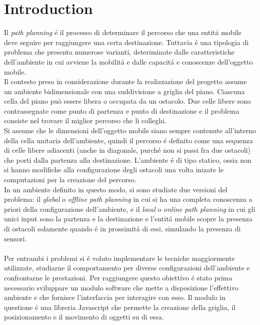 \documentclass[conference]{IEEEtran}
\begin{document}
\section{Introduction}
Il \textit{path planning} \'e il processo di determinare il percorso che una 
entit\'a mobile deve seguire per raggiungere una certa destinazione. Tuttavia \'e una tipologia 
di problema che presenta numerose varianti, deteriminate dalle caratteristiche dell'ambiente
in cui avviene la mobilit\'a e dalle capacit\'a e conoscenze dell'oggetto mobile. 
\\
Il contesto preso in considerazione durante la realizzazione del progetto assume un ambiente
bidimensionale con una suddivisione a griglia del piano. Ciascuna cella del piano può essere libera
o occupata da un ostacolo. Due celle libere sono contrassegnate come punto di partenza e punto di
destinazione e il problema consiste nel trovare il miglior percorso che li colleghi.
\\
Si assume che le dimensioni dell'oggetto mobile siano sempre contenute all'interno della cella
unitaria dell'ambiente, quindi il percorso \'e definito come una sequenza di celle libere 
adiacenti (anche in diagonale, purch\'e non si passi fra due ostacoli) che porti dalla partenza 
alla destinazione. 
L'ambiente \'e di tipo statico, ossia non si hanno modifiche alla configurazione degli ostacoli
una volta inizate le computazioni per la creazione del percorso.
\\
In un ambiente definito in questo modo, si sono studiate due versioni del problema: il 
\textit{global} o \textit{offline path planning} in cui si ha una completa conoscenza a priori
della configurazione dell'ambiente, e il \textit{local} o \textit{online path planning} in cui gli
unici input sono la partenza e la destinazione e l'entit\'a mobile scopre la presenza di ostacoli
solamente quando \'e in prossimit\'a di essi, simulando la presenza di sensori.
\\
\\ 
Per entrambi i problemi si \'e voluto implementare le tecniche maggiormente utilizzate, studiarne
il comportamento per diverse configurazioni dell'ambiente e confrontarne le prestazioni.
Per raggiungere questo obiettivo \'e stato prima necessario sviluppare un modulo software che 
mette a disposizione l'effettivo ambiente e che fornisce
l'interfaccia per interagire con esso. Il modulo in questione \'e una libreria Javascript che
permette la creazione della griglia, il posizionamento e il movimento di oggetti su di essa.
\end{document}
